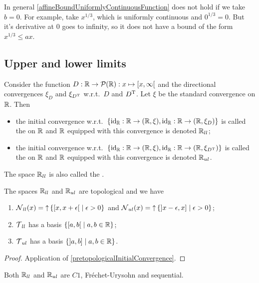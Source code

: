 \begin{example}
In general \ref{affineBoundUniformlyContinuousFunction} does not hold if we take $b=0$. For example, take $x^{1/3}$, which is uniformly continuous and $0^{1/3} = 0$. But it's derivative at $0$ goes to infinity, so it does not have a bound of the form $x^{1/3} \leq ax$.
\end{example}

\subsection{Upper and lower limits}
\begin{definition}
Consider the function $D: \R \to\powerset(\R): x\mapsto \interval[co]{x,\infty}$ and the directional convergences $\xi_D$ and $\xi_{D^{\mathrm{T}}}$ w.r.t.\ $D$ and $D^{\mathrm{T}}$. Let $\xi$ be the standard convergence on $\mathbb{R}$.
Then
\begin{itemize}
\item the initial convergence w.r.t.\ $\{\id_\R: \R\to \sSet{\R,\xi}, \id_\R: \R\to \sSet{\R,\xi_D}\}$ is called the  on $\mathbb{R}$ and $\mathbb{R}$ equipped with this convergence is denoted $\mathbb{R}_{ll}$;
\item the initial convergence w.r.t.\ $\{\id_\R: \R\to \sSet{\R,\xi}, \id_\R: \R\to \sSet{\R,\xi_{D^\transp}}\}$ is called the  on $\mathbb{R}$ and $\mathbb{R}$ equipped with this convergence is denoted $\mathbb{R}_{ul}$.
\end{itemize}
The space $\mathbb{R}_{ll}$ is also called the .
\end{definition}

\begin{proposition}
The spaces $\mathbb{R}_{ll}$ and $\mathbb{R}_{ul}$ are topological and we have
\begin{enumerate}
\item $\neighbourhoods_{ll}(x) = \upset \setbuilder{\interval[co]{x,x+\epsilon}}{\epsilon > 0}$ and $\neighbourhoods_{ul}(x) = \upset \setbuilder{\interval[oc]{x-\epsilon, x}}{\epsilon > 0}$;
\item $\operatorname{\mathcal{T}}_{ll}$ has a basis $\setbuilder{\interval[co]{a,b}}{a,b\in \R}$;
\item $\operatorname{\mathcal{T}}_{ul}$ has a basis $\setbuilder{\interval[oc]{a,b}}{a,b\in \R}$.
\end{enumerate}
\end{proposition}
\begin{proof}
Application of \ref{pretopologicalInitialConvergence}.
\end{proof}
\begin{corollary} \label{SorgenfreyLineC1}
Both $\mathbb{R}_{ll}$ and $\mathbb{R}_{ul}$ are $C1$, Fréchet-Urysohn and sequential.
\end{corollary}

